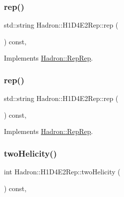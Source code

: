 \subsubsection{\texorpdfstring{rep()}{rep()}\hspace{0.1cm}{\footnotesize\ttfamily [2/3]}}
{\footnotesize\ttfamily std\+::string Hadron\+::\+H1\+D4\+E2\+Rep\+::rep (\begin{DoxyParamCaption}{ }\end{DoxyParamCaption}) const\hspace{0.3cm}{\ttfamily [inline]}, {\ttfamily [virtual]}}



Implements \mbox{\hyperlink{structHadron_1_1RepRep_ab3213025f6de249f7095892109575fde}{Hadron\+::\+Rep\+Rep}}.

\mbox{\label{structHadron_1_1H1D4E2Rep_a21042b3f507f32a467b776db77aa093f}} 
\subsubsection{\texorpdfstring{rep()}{rep()}\hspace{0.1cm}{\footnotesize\ttfamily [3/3]}}
{\footnotesize\ttfamily std\+::string Hadron\+::\+H1\+D4\+E2\+Rep\+::rep (\begin{DoxyParamCaption}{ }\end{DoxyParamCaption}) const\hspace{0.3cm}{\ttfamily [inline]}, {\ttfamily [virtual]}}



Implements \mbox{\hyperlink{structHadron_1_1RepRep_ab3213025f6de249f7095892109575fde}{Hadron\+::\+Rep\+Rep}}.

\mbox{\label{structHadron_1_1H1D4E2Rep_a47b668915545d363a373bd37f3bfb75f}} 
\subsubsection{\texorpdfstring{twoHelicity()}{twoHelicity()}\hspace{0.1cm}{\footnotesize\ttfamily [1/2]}}
{\footnotesize\ttfamily int Hadron\+::\+H1\+D4\+E2\+Rep\+::two\+Helicity (\begin{DoxyParamCaption}{ }\end{DoxyParamCaption}) const\hspace{0.3cm}{\ttfamily [inline]}, {\ttfamily [virtual]}}

